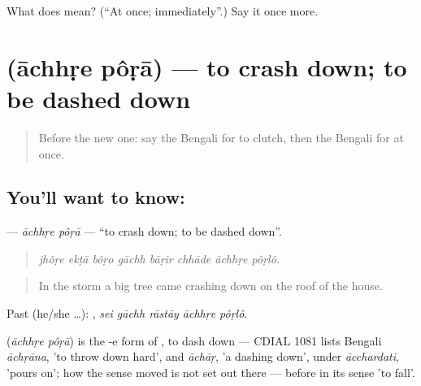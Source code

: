 \begin{tcolorbox}[breakable,colback=teal!4,colframe=teal!35!black,title={Before you move on}]
What does  mean? (\textquotedblleft{}At once; immediately\textquotedblright{}.) Say it once more.
\end{tcolorbox}
\section[\texorpdfstring{\bn{আছড়ে} \bn{পড়া} (āchhṛe pôṛā)}{আছড়ে পড়া (āchhṛe pôṛā)}]{  (āchhṛe pôṛā) — to crash down; to be dashed down}

\label{lesson:BN-C287-achhre-pora}



\begin{quote}
Before the new one: say the Bengali for to clutch, then the Bengali for at once.
\end{quote}

\subsection*{You'll want to know:  }
\textbf{ } — \emph{āchhṛe pôṛā} — \textquotedblleft{}to crash down; to be dashed down\textquotedblright{}.

\begin{quote}
       
\end{quote}

\begin{quote}
\emph{jhôṛe ekṭā bôṛo gāchh bāṛir chhāde āchhṛe pôṛlô.}
\end{quote}

\begin{quote}
In the storm a big tree came crashing down on the roof of the house.
\end{quote}

Past (he/she …):     , \emph{sei gāchh rāstāy āchhṛe pôṛlô}.

\begin{cousinweb}
\textbf{ } (\emph{āchhṛe pôṛā}) is the -e form of , to dash down — CDIAL 1081 lists Bengali \emph{āchṛāna}, 'to throw down hard', and \emph{āchāṛ}, 'a dashing down', under \emph{ācchardati}, 'pours on'; how the sense moved is not set out there — before  in its sense 'to fall'.
\end{cousinweb}


